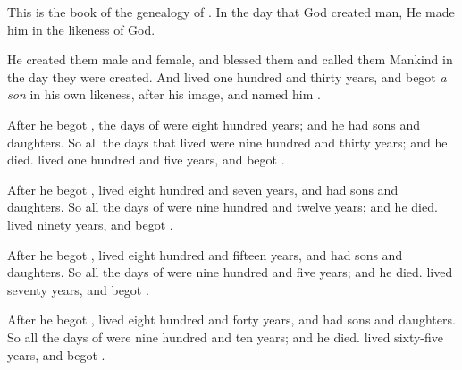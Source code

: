 

\bverse This is the book of the genealogy of . In the day that God created man, He made him in the likeness of God.

\bverse He created them male and female, and blessed them and called them Mankind in the day they were created.
\bverse And  lived one hundred and thirty years, and begot \textit{a son} in his own likeness, after his image, and named him .

\bverse After he begot , the days of  were eight hundred years; and he had sons and daughters.
\bverse So all the days that  lived were nine hundred and thirty years; and he died.
\bverse {} lived one hundred and five years, and begot .
	
\bverse After he begot ,  lived eight hundred and seven years, and had sons and daughters.	
\bverse So all the days of  were nine hundred and twelve years; and he died.
\bverse {} lived ninety years, and begot .
	
\bverse After he begot ,  lived eight hundred and fifteen years, and had sons and daughters.	
\bverse So all the days of  were nine hundred and five years; and he died.
\bverse {} lived seventy years, and begot .
	
\bverse After he begot ,  lived eight hundred and forty years, and had sons and daughters.	
\bverse So all the days of  were nine hundred and ten years; and he died.
\bverse {} lived sixty-five years, and begot . 
	
